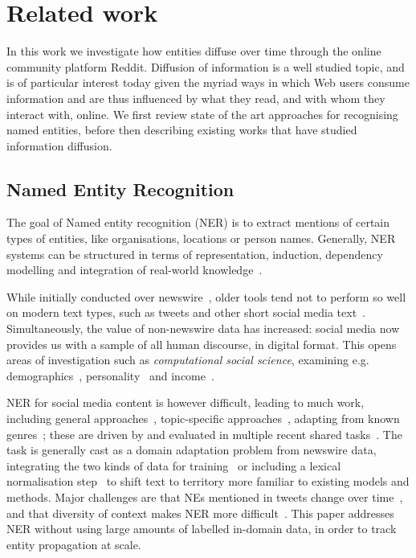 \documentclass[sigconf]{acmart}
\begin{document}

\section{Related work}
\label{sec:rw}
In this work we investigate how entities diffuse over time through the online community platform Reddit.
Diffusion of information is a well studied topic, and is of particular interest today given the myriad ways in which Web users consume information and are thus influenced by what they read, and with whom they interact with, online.
We first review state of the art approaches for recognising named entities, before then describing existing works that have studied information diffusion.

\subsection{Named Entity Recognition}
The goal of Named entity recognition (NER) is to extract mentions of certain types of entities, like organisations, locations or person names.
Generally, NER systems can be structured in terms of representation, induction, dependency modelling and integration of real-world knowledge~\cite{nadeau2007survey,ratinov2009design}.

While initially conducted over newswire~\cite{tjong2003introduction}, older tools tend not to perform so well on modern text types, such as tweets and other short social media text~\cite{derczynski2015analysis}.
Simultaneously, the value of non-newswire data has increased: social media now provides us with a sample of all human discourse, %
in digital format. This opens areas of investigation such as {\em computational social science}, examining e.g. demographics~\cite{hovy2015user}, personality~\cite{plank2015personality} and income~\cite{preoctiuc2015studying}.

NER for social media content is however difficult, leading to much work, including general approaches~\cite{ritter2011named}, topic-specific approaches~\cite{liu2011recognizing}, adapting from known genres~\cite{plank2014adapting}; these are driven by and evaluated in multiple recent shared tasks~\cite{rowe2015microposts2015,baldwin2015shared}.
The task is generally cast as a domain adaptation problem from newswire data, integrating the two kinds of data for training~\cite{cherryunreasonable} or including a lexical normalisation step~\cite{han2011lexical} to shift text to territory more familiar to existing models and methods.
Major challenges are that NEs mentioned in tweets change over time~\cite{fromreide2014crowdsourcing}, and that diversity of context makes NER more difficult~\cite{derczynski2015analysis}. 
This paper addresses NER without using large amounts of labelled in-domain data, in order to track entity propagation at scale.%
\end{document}
